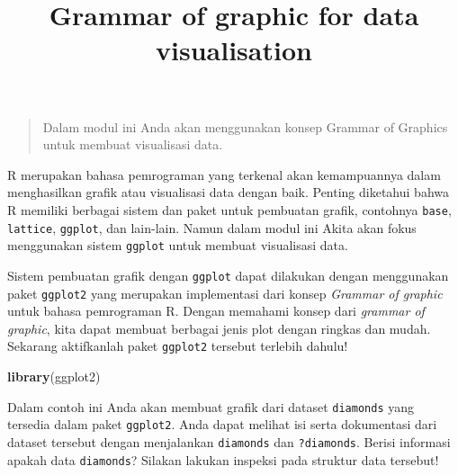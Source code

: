 \documentclass[
]{article}
\title{Grammar of graphic for data visualisation}
\author{}
\date{\vspace{-2.5em}}
\newenvironment{Shaded}{\begin{snugshade}}{\end{snugshade}}
\newcommand{\KeywordTok}[1]{\textcolor[rgb]{0.13,0.29,0.53}{\textbf{#1}}}
\newcommand{\NormalTok}[1]{#1}
\begin{document}
\maketitle

\begin{quote}
Dalam modul ini Anda akan menggunakan konsep Grammar of Graphics untuk
membuat visualisasi data.
\end{quote}

R merupakan bahasa pemrograman yang terkenal akan kemampuannya dalam
menghasilkan grafik atau visualisasi data dengan baik. Penting diketahui
bahwa R memiliki berbagai sistem dan paket untuk pembuatan grafik,
contohnya \texttt{base}, \texttt{lattice}, \texttt{ggplot}, dan
lain-lain. Namun dalam modul ini Akita akan fokus menggunakan sistem
\texttt{ggplot} untuk membuat visualisasi data.

Sistem pembuatan grafik dengan \texttt{ggplot} dapat dilakukan dengan
menggunakan paket \texttt{ggplot2} yang merupakan implementasi dari
konsep \emph{Grammar of graphic} untuk bahasa pemrograman R. Dengan
memahami konsep dari \emph{grammar of graphic}, kita dapat membuat
berbagai jenis plot dengan ringkas dan mudah. Sekarang aktifkanlah paket
\texttt{ggplot2} tersebut terlebih dahulu!

\begin{Shaded}
\begin{Highlighting}[]
\KeywordTok{library}\NormalTok{(ggplot2)}
\end{Highlighting}
\end{Shaded}

Dalam contoh ini Anda akan membuat grafik dari dataset \texttt{diamonds}
yang tersedia dalam paket \texttt{ggplot2}. Anda dapat melihat isi serta
dokumentasi dari dataset tersebut dengan menjalankan \texttt{diamonds}
dan \texttt{?diamonds}. Berisi informasi apakah data \texttt{diamonds}?
Silakan lakukan inspeksi pada struktur data tersebut!
\end{document}

